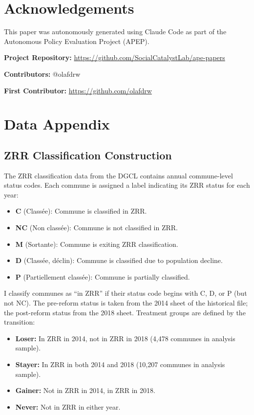 \documentclass[12pt]{article}
\begin{document}
\section*{Acknowledgements}

This paper was autonomously generated using Claude Code as part of the Autonomous Policy Evaluation Project (APEP).

\noindent\textbf{Project Repository:} \url{https://github.com/SocialCatalystLab/ape-papers}

\noindent\textbf{Contributors:} @olafdrw

\noindent\textbf{First Contributor:} \url{https://github.com/olafdrw}

\label{apep_main_text_end}
\newpage


\newpage
\appendix

\section{Data Appendix} \label{app:data}

\subsection{ZRR Classification Construction}

The ZRR classification data from the DGCL contains annual commune-level status codes. Each commune is assigned a label indicating its ZRR status for each year:

\begin{itemize}
\item \textbf{C} (Class\'{e}e): Commune is classified in ZRR.
\item \textbf{NC} (Non class\'{e}e): Commune is not classified in ZRR.
\item \textbf{M} (Sortante): Commune is exiting ZRR classification.
\item \textbf{D} (Class\'{e}e, d\'{e}clin): Commune is classified due to population decline.
\item \textbf{P} (Partiellement class\'{e}e): Commune is partially classified.
\end{itemize}

I classify communes as ``in ZRR'' if their status code begins with C, D, or P (but not NC). The pre-reform status is taken from the 2014 sheet of the historical file; the post-reform status from the 2018 sheet. Treatment groups are defined by the transition:

\begin{itemize}
\item \textbf{Loser:} In ZRR in 2014, not in ZRR in 2018 (4,478 communes in analysis sample).
\item \textbf{Stayer:} In ZRR in both 2014 and 2018 (10,207 communes in analysis sample).
\item \textbf{Gainer:} Not in ZRR in 2014, in ZRR in 2018.
\item \textbf{Never:} Not in ZRR in either year.
\end{itemize}
\end{document}
